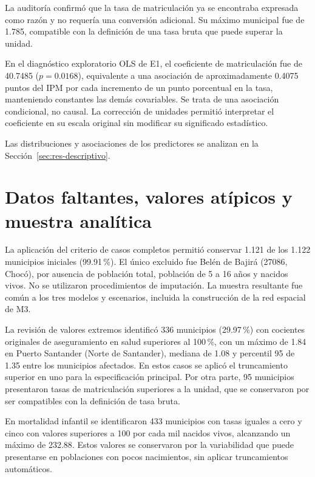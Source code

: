 La auditoría confirmó que la tasa de matriculación ya se encontraba expresada como razón y no requería una conversión adicional. Su máximo municipal fue de 1.785, compatible con la definición de una tasa bruta que puede superar la unidad.

En el diagnóstico exploratorio OLS de E1, el coeficiente de matriculación fue de 40.7485 ($p=0.0168$), equivalente a una asociación de aproximadamente 0.4075 puntos del IPM por cada incremento de un punto porcentual en la tasa, manteniendo constantes las demás covariables. Se trata de una asociación condicional, no causal. La corrección de unidades permitió interpretar el coeficiente en su escala original sin modificar su significado estadístico.

Las distribuciones y asociaciones de los predictores se analizan en la Sección~\ref{sec:res-descriptivo}.


\section{Datos faltantes, valores atípicos y muestra analítica}
\label{sec:res-muestra}

La aplicación del criterio de casos completos permitió conservar 1.121 de los 1.122 municipios iniciales (99.91\,\%). El único excluido fue Belén de Bajirá (27086, Chocó), por ausencia de población total, población de 5 a 16 años y nacidos vivos. No se utilizaron procedimientos de imputación. La muestra resultante fue común a los tres modelos y escenarios, incluida la construcción de la red espacial de M3.

La revisión de valores extremos identificó 336 municipios (29.97\,\%) con cocientes originales de aseguramiento en salud superiores al 100\,\%, con un máximo de 1.84 en Puerto Santander (Norte de Santander), mediana de 1.08 y percentil 95 de 1.35 entre los municipios afectados. En estos casos se aplicó el truncamiento superior en uno para la especificación principal. Por otra parte, 95 municipios presentaron tasas de matriculación superiores a la unidad, que se conservaron por ser compatibles con la definición de tasa bruta.

En mortalidad infantil se identificaron 433 municipios con tasas iguales a cero y cinco con valores superiores a 100 por cada mil nacidos vivos, alcanzando un máximo de 232.88. Estos valores se conservaron por la variabilidad que puede presentarse en poblaciones con pocos nacimientos, sin aplicar truncamientos automáticos.

